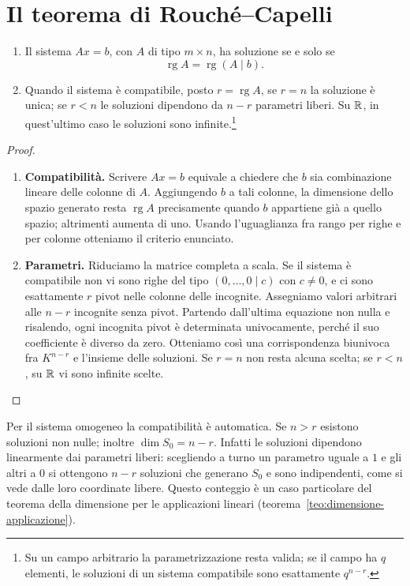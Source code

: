 \section{Il teorema di Rouché--Capelli}
\begin{teorema}
\begin{enumerate}[label=\arabic*.]
\item Il sistema $Ax=b$, con $A$ di tipo $m\times n$, ha soluzione se e solo se
\[
 \operatorname{rg}A=\operatorname{rg}(A\mid b).
\]
\item Quando il sistema è compatibile, posto $r=\operatorname{rg}A$, se $r=n$ la soluzione è unica; se $r<n$ le soluzioni dipendono da $n-r$ parametri liberi. Su $\mathbb{R}$, in quest'ultimo caso le soluzioni sono infinite.\footnote{Su un campo arbitrario la parametrizzazione resta valida; se il campo ha $q$ elementi, le soluzioni di un sistema compatibile sono esattamente $q^{n-r}$.}
\end{enumerate}
\end{teorema}
\begin{proof}
\begin{enumerate}[label=\arabic*.]
\item \textbf{Compatibilità.} Scrivere $Ax=b$ equivale a chiedere che $b$ sia combinazione lineare delle colonne di $A$. Aggiungendo $b$ a tali colonne, la dimensione dello spazio generato resta $\operatorname{rg}A$ precisamente quando $b$ appartiene già a quello spazio; altrimenti aumenta di uno. Usando l'uguaglianza fra rango per righe e per colonne otteniamo il criterio enunciato.
\item \textbf{Parametri.} Riduciamo la matrice completa a scala. Se il sistema è compatibile non vi sono righe del tipo $(0,\ldots,0\mid c)$ con $c\ne0$, e ci sono esattamente $r$ pivot nelle colonne delle incognite. Assegniamo valori arbitrari alle $n-r$ incognite senza pivot. Partendo dall'ultima equazione non nulla e risalendo, ogni incognita pivot è determinata univocamente, perché il suo coefficiente è diverso da zero. Otteniamo così una corrispondenza biunivoca fra $K^{n-r}$ e l'insieme delle soluzioni. Se $r=n$ non resta alcuna scelta; se $r<n$, su $\mathbb{R}$ vi sono infinite scelte.
\end{enumerate}
\end{proof}
Per il sistema omogeneo la compatibilità è automatica. Se $n>r$ esistono soluzioni non nulle; inoltre $\dim S_0=n-r$. Infatti le soluzioni dipendono linearmente dai parametri liberi: scegliendo a turno un parametro uguale a $1$ e gli altri a $0$ si ottengono $n-r$ soluzioni che generano $S_0$ e sono indipendenti, come si vede dalle loro coordinate libere. Questo conteggio è un caso particolare del teorema della dimensione per le applicazioni lineari (teorema~\ref{teo:dimensione-applicazione}).

